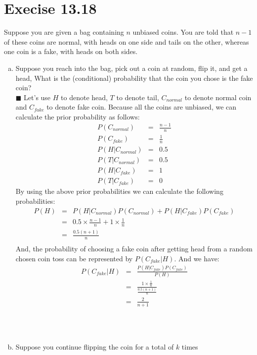 \documentclass{article}
\newcommand{\solution}[1]{~\\ $\blacksquare$ \sffamily\upshape\selectfont #1
\normalfont ~\\~ }
\begin{document}
\section{Execise 13.18}
Suppose you are given a bag containing $n$ unbiased coins. You are told
that $n-1$ of these coins are normal, with heads on one side and tails
on the other, whereas one coin is a fake, with heads on both sides.
\begin{enumerate}[a.]
  \item Suppose you reach into the bag, pick out a coin at random,
    flip it, and get a head, What is the (conditional) probability that
    the coin you chose is the fake coin?
    \solution{Let's use $H$ to denote head, $T$ to denote tail,
      $C_{normal}$ to denote normal coin and $C_{fake}$ to denote fake
      coin. Because all the coins are unbiased, we can calculate the
      prior probability as follows:  
      \begin{eqnarray*}
        P(C_{normal}) & = & \frac{n-1}{n} \\ 
        P(C_{fake}) & = & \frac{1}{n} \\
        P(H|C_{normal}) & = & 0.5 \\ 
        P(T|C_{normal}) & = & 0.5 \\
        P(H|C_{fake}) & = & 1 \\ 
        P(T|C_{fake}) & = & 0
      \end{eqnarray*}
      By using the above prior probabilities we can calculate the
      following probabilities: 
      \begin{eqnarray*}
        P(H) & = & P(H|C_{normal})P(C_{normal}) + P(H|C_{fake})P(C_{fake})  \\
        & = & 0.5\times \frac{n-1}{n} + 1\times \frac{1}{n} \\
        & = & \frac{0.5(n+1)}{n} \\
      \end{eqnarray*}
      And, the probability of choosing a fake coin after getting
      head from a random chosen coin toss can be represented by
      $P(C_{fake}|H)$. And we have: 
      \begin{eqnarray*}
        P(C_{fake}|H) & = & \frac{P(H|C_{fake})P(C_{fake})}{P(H)} \\
        & = & \frac{1\times \frac{1}{n}}{\frac{0.5(n+1)}{n}} \\
        & = & \frac{2}{n+1}
      \end{eqnarray*}
} 
  \item Suppose you continue flipping the coin for a total of $k$ times

\end{enumerate}
\end{document}
